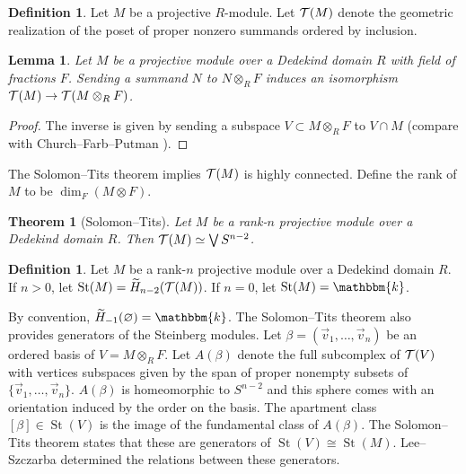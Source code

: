 \documentclass[11pt,letterpaper]{amsart}
\newcommand{\bk}{\mathbbm{k}}
\numberwithin{theoremcounter}{section}
\newtheorem{theorem}[theoremauto]{Theorem}
\newtheorem{lemma}[lemmaauto]{Lemma}
\theoremstyle{definition}
\newtheorem{definition}[Defauto]{Definition}
\theoremstyle{remark}
\DeclareMathOperator{\St}{St}
\begin{document}
\begin{definition} Let $M$ be a projective $R$-module. Let $\mathcal{T}(M)$ denote the geometric realization of the poset of proper nonzero summands ordered by inclusion.
\end{definition}



\begin{lemma} Let $M$ be a projective module over a Dedekind domain $R$ with field of fractions $F$.
Sending a summand $N$ to $N \otimes_R F$ induces an isomorphism $\mathcal{T}(M) \to \mathcal{T}(M \otimes_R F)$.
\end{lemma}

\begin{proof}
    The inverse is given by sending a subspace $V \subset M \otimes_R F$ to $V \cap M$ (compare with Church--Farb--Putman \cite[Lemma 2.2(c)]{CFP}).
\end{proof}

The Solomon--Tits theorem implies $\mathcal{T}(M)$ is highly connected. Define the rank of $M$ to be $\dim_{F} (M \otimes F)$.

\begin{theorem}[Solomon--Tits] Let $M$ be a rank-$n$ projective module over a Dedekind domain $R$. Then $\mathcal{T}(M) \simeq \bigvee S^{n-2}$.
\end{theorem}

\begin{definition} Let $M$ be a rank-$n$ projective module over a Dedekind domain $R$. If $n>0$, let $\St(M)=\widetilde H_{n-2}(\cT(M))$. If $n=0$, let $\St(M)=\bk$.
\end{definition}


By convention, $\widetilde H_{-1}(\varnothing) = \bk$. 
The Solomon--Tits theorem also provides generators of the Steinberg modules. Let $\beta=(\vec v_1,\ldots,\vec v_n)$ be an ordered basis of $V=M \otimes_R F$. Let $A(\beta)$ denote the full subcomplex of $\mathcal{T}(V)$ with vertices subspaces given by the span of proper nonempty subsets of $\{\vec v_1, \dots, \vec v_n\}$. $A(\beta)$ is homeomorphic to $S^{n-2}$ and this sphere comes with an orientation induced by the order on the basis. The apartment class $[\beta]\in \St(V)$ is the image of the fundamental class of $A(\beta)$. The Solomon--Tits theorem states that these are generators of $\St(V) \cong \St(M)$. Lee--Szczarba \cite{LS} determined the relations between these generators.
\end{document}
